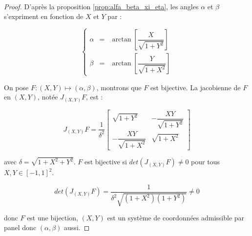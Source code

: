 \begin{proof}

D'après la proposition \ref{prop:alfa_beta_xi_eta}, les angles $\alpha$ et $\beta$ s'expriment en fonction de $X$ et $Y$ par :

\begin{equation}
\left\lbrace
\begin{array}{rcl}
\alpha & = & \arctan \left[ \dfrac{X}{\sqrt{1+ Y^2}} \right] \\
\beta & = & \arctan \left[ \dfrac{Y}{\sqrt{1+X^2}} \right] 
\end{array}
\right.
\label{eq: alpha et beta fct de X et Y}
\end{equation}

On pose $F : (X,Y) \mapsto (\alpha,  \beta)$, montrons que $F$ est bijective. La jacobienne de $F$ en $(X,Y)$, notée $J_{(X,Y)}F$, est :

\begin{equation}
J_{(X,Y)}F = \dfrac{1}{\delta^2} 
\begin{bmatrix}
\sqrt{1+Y^2} & - \dfrac{XY}{\sqrt{1+Y^2}} \\
- \dfrac{XY}{\sqrt{1+X^2}} & \sqrt{1+X^2}
\end{bmatrix}
\end{equation}

avec $\delta = \sqrt{1+X^2+Y^2}$. $F$ est bijective si $det \left( J_{(X,Y)}F \right) \neq 0$ pour tous $X,Y \in [-1,1]^2$.

\begin{equation}
det \left( J_{(X,Y)}F \right) = \dfrac{1}{\delta^2 \sqrt{(1+X^2)(1+Y^2)}} \neq 0
\end{equation}

donc $F$ est une bijection, $(X,Y)$ est un système de coordonnées admissible par panel donc $(\alpha, \beta)$ aussi.

\end{proof}






















